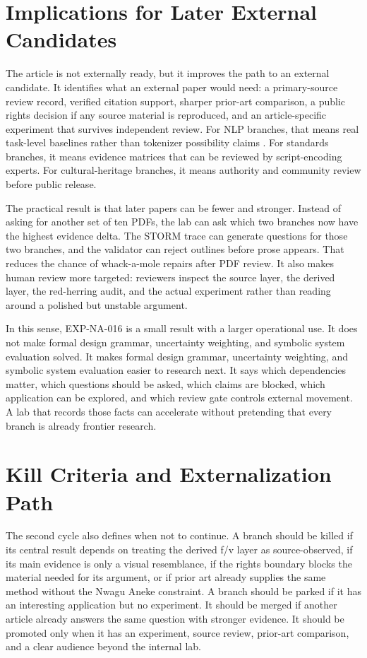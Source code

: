 \documentclass[sigconf,nonacm]{acmart}
\begin{document}
\section{Implications for Later External Candidates}
The article is not externally ready, but it improves the path to an external
candidate. It identifies what an external paper would need: a primary-source
review record, verified citation support, sharper prior-art comparison, a public
rights decision if any source material is reproduced, and an article-specific
experiment that survives independent review. For NLP branches, that means real
task-level baselines rather than tokenizer possibility claims \cite{wadden2020scifact,gao2023alce,sennrich2016bpe,kudo2018sentencepiece,bostrom2020bytepair,rust2021tokenization}.
For standards branches, it means evidence matrices that can be reviewed by
script-encoding experts. For cultural-heritage branches, it means authority and
community review before public release.

The practical result is that later papers can be fewer and stronger. Instead of
asking for another set of ten PDFs, the lab can ask which two branches now have
the highest evidence delta. The STORM trace can generate questions for those two
branches, and the validator can reject outlines before prose appears. That
reduces the chance of whack-a-mole repairs after PDF review. It also makes
human review more targeted: reviewers inspect the source layer, the derived
layer, the red-herring audit, and the actual experiment rather than reading
around a polished but unstable argument.

In this sense, EXP-NA-016 is a small result with a larger operational use. It
does not make formal design grammar, uncertainty weighting, and symbolic system evaluation solved. It makes formal design grammar, uncertainty weighting, and symbolic system evaluation easier to research next. It says
which dependencies matter, which questions should be asked, which claims are
blocked, which application can be explored, and which review gate controls
external movement. A lab that records those facts can accelerate without
pretending that every branch is already frontier research.

\section{Kill Criteria and Externalization Path}
The second cycle also defines when not to continue. A branch should be killed if
its central result depends on treating the derived f/v layer as source-observed,
if its main evidence is only a visual resemblance, if the rights boundary blocks
the material needed for its argument, or if prior art already supplies the same
method without the Nwagu Aneke constraint. A branch should be parked if it has
an interesting application but no experiment. It should be merged if another
article already answers the same question with stronger evidence. It should be
promoted only when it has an experiment, source review, prior-art comparison,
and a clear audience beyond the internal lab.
\end{document}

